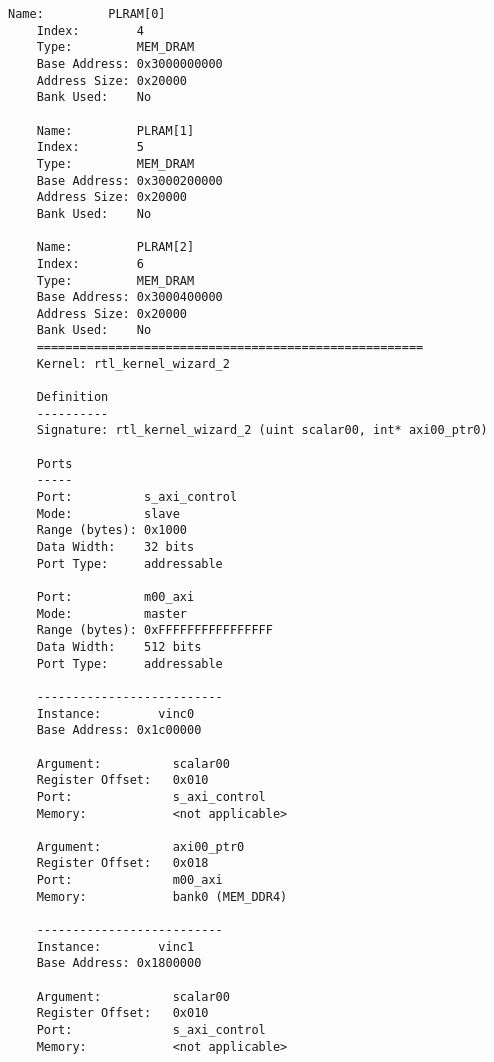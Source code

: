 \begin{lstlisting}[caption=Содержимое файла vinc.xclbin.info, label={infof}]
	Name:         PLRAM[0]
	Index:        4
	Type:         MEM_DRAM
	Base Address: 0x3000000000
	Address Size: 0x20000
	Bank Used:    No
	
	Name:         PLRAM[1]
	Index:        5
	Type:         MEM_DRAM
	Base Address: 0x3000200000
	Address Size: 0x20000
	Bank Used:    No
	
	Name:         PLRAM[2]
	Index:        6
	Type:         MEM_DRAM
	Base Address: 0x3000400000
	Address Size: 0x20000
	Bank Used:    No
	======================================================
	Kernel: rtl_kernel_wizard_2
	
	Definition
	----------
	Signature: rtl_kernel_wizard_2 (uint scalar00, int* axi00_ptr0)
	
	Ports
	-----
	Port:          s_axi_control
	Mode:          slave
	Range (bytes): 0x1000
	Data Width:    32 bits
	Port Type:     addressable
	
	Port:          m00_axi
	Mode:          master
	Range (bytes): 0xFFFFFFFFFFFFFFFF
	Data Width:    512 bits
	Port Type:     addressable
	
	--------------------------
	Instance:        vinc0
	Base Address: 0x1c00000
	
	Argument:          scalar00
	Register Offset:   0x010
	Port:              s_axi_control
	Memory:            <not applicable>
	
	Argument:          axi00_ptr0
	Register Offset:   0x018
	Port:              m00_axi
	Memory:            bank0 (MEM_DDR4)
	
	--------------------------
	Instance:        vinc1
	Base Address: 0x1800000
	
	Argument:          scalar00
	Register Offset:   0x010
	Port:              s_axi_control
	Memory:            <not applicable>
	

\end{lstlisting}
